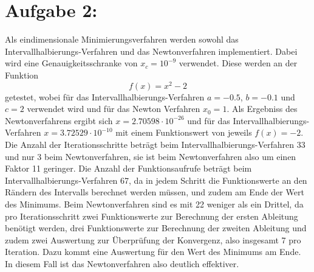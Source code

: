 \section*{Aufgabe 2: }



Als eindimensionale Minimierungsverfahren werden sowohl das Intervallhalbierungs-Verfahren und das
Newtonverfahren implementiert. Dabei wird eine Genauigkeitsschranke von $x_c=10^{-9}$ verwendet.
Diese werden an der Funktion
\begin{equation}
  f(x)=x^2-2
\end{equation}
getestet, wobei für das Intervallhalbierungs-Verfahren $a=-0.5$, $b=-0.1$ und $c=2$ verwendet wird und
für das Newton Verfahren $x_0=1$.
Als Ergebniss des Newtonverfahrens ergibt sich $ {x=2.70598\cdot 10^{-26}}$ und für das Intervallhalbierungs-Verfahren ${x=3.72529\cdot 10^{-10}}$ mit einem Funktionswert von jeweils ${f(x)=-2}$.
Die Anzahl der Iterationsschritte beträgt beim Intervallhalbierungs-Verfahren 33 und nur 3 beim Newtonverfahren, sie ist beim Newtonverfahren also um einen Faktor 11 geringer. Die Anzahl der Funktionsaufrufe beträgt beim Intervallhalbierungs-Verfahren
67, da in jedem Schritt die Funktionswerte an den Rändern des Intervalls berechnet werden müssen, und zudem am Ende der Wert des Minimums. Beim Newtonverfahren sind
es mit 22 weniger als ein Drittel, da pro Iterationsschritt zwei Funktionswerte zur Berechnung der ersten Ableitung benötigt werden, drei Funktionswerte zur Berechnung der zweiten Ableitung und zudem zwei Auswertung zur Überprüfung der Konvergenz, also insgesamt 7 pro Iteration. Dazu kommt eine Auswertung für den Wert des Minimums am Ende. In diesem Fall ist das Newtonverfahren also deutlich effektiver.

